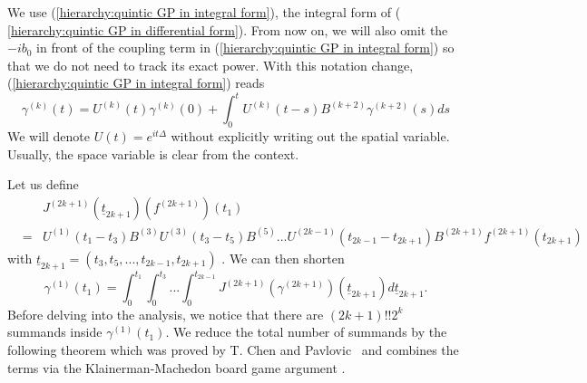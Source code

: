 \documentclass[12pt,letterpaper,leqno]{amsart}
\theoremstyle{plain}
\numberwithin{equation}{section}
\numberwithin{theorem}{section}
\numberwithin{proposition}{section}
\numberwithin{lemma}{section}
\numberwithin{corollary}{section}
\begin{document}
We use (\ref{hierarchy:quintic GP in integral form}), the integral form of (%
\ref{hierarchy:quintic GP in differential form}). From now on, we will also
omit the $-ib_{0}$ in front of the coupling term in (\ref{hierarchy:quintic
GP in integral form}) so that we do not need to track its exact power. With
this notation change, (\ref{hierarchy:quintic GP in integral form}) reads 
\begin{equation}
\gamma ^{(k)}(t)=U^{(k)}(t)\gamma
^{(k)}(0)+\int_{0}^{t}U^{(k)}(t-s)B^{(k+2)}\gamma ^{(k+2)}(s)ds
\label{hierarchy:GPwithCouplingI}
\end{equation}%
We will denote $U(t)=e^{it\Delta }$ without explicitly writing out the
spatial variable. Usually, the space variable is clear from the context.

Let us define 
\begin{eqnarray*}
&&J^{(2k+1)}(\underline{t}_{2k+1})(f^{(2k+1)})(t_{1}) \\
&=&U^{(1)}(t_{1}-t_{3})B^{(3)}U^{(3)}(t_{3}-t_{5})B^{(5)}...U^{(2k-1)}(t_{2k-1}-t_{2k+1})B^{(2k+1)}f^{(2k+1)}(t_{2k+1})
\end{eqnarray*}%
with $\underline{t}_{2k+1}=\left( t_{3},t_{5},...,t_{2k-1},t_{2k+1}\right) $%
. We can then shorten%
\begin{equation*}
\gamma
^{(1)}(t_{1})=\int_{0}^{t_{1}}\int_{0}^{t_{3}}...%
\int_{0}^{t_{2k-1}}J^{(2k+1)}(\gamma ^{(2k+1)})(\underline{t}_{2k+1})d%
\underline{t}_{2k+1}\text{.}
\end{equation*}%
Before delving into the analysis, we notice that there are $(2k+1)!!2^{k}$
summands inside $\gamma ^{(1)}(t_{1})$. We reduce the total number of
summands by the following theorem which was proved by T. Chen and Pavlovic 
\cite{TChenAndNP}\ and combines the terms via the Klainerman-Machedon board
game argument \cite{KlainermanAndMachedon}.
\end{document}
